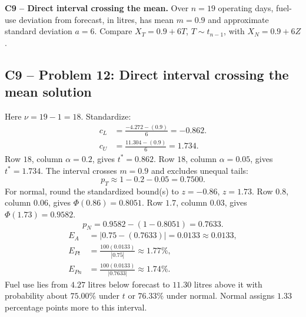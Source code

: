 {
\textbf{C9 -- Direct interval crossing the mean.} Over $n=19$ operating days, fuel-use deviation from forecast, in litres, has mean $m=0.9$ and approximate standard deviation $a=6$. Compare $X_T=0.9+6T$, $T\sim t_{n-1}$, with $X_N=0.9+6Z$.
\label{sol:q12}
\subsection*{C9 -- Problem 12: Direct interval crossing the mean solution }
Here $\nu=19-1=18$. Standardize:
\[
\begin{aligned}
c_L&=\frac{-4.272-(0.9)}{6}=-0.862.\\
c_U&=\frac{11.304-(0.9)}{6}=1.734.
\end{aligned}
\]
Row $18$, column $\alpha=0.2$, gives $t^*=0.862$. Row $18$, column $\alpha=0.05$, gives $t^*=1.734$. 
The interval crosses $m=0.9$ and excludes unequal tails:
\[
p_T\approx1-0.2-0.05=\boxed{0.7500}.
\]
For normal, round the standardized bound(s) to $z=-0.86$, $z=1.73$.
Row $0.8$, column $0.06$, gives $\Phi(0.86)=0.8051$. Row $1.7$, column $0.03$, gives $\Phi(1.73)=0.9582$. 
\[
p_N=0.9582-(1-0.8051)=\boxed{0.7633}.
\]
\[
\begin{aligned}
E_{A}&=|0.75-(0.7633)|=0.0133\approx\boxed{0.0133},\\
E_{Pt}&=\frac{100(0.0133)}{|0.75|}\approx\boxed{1.77\%},\\
E_{Pn}&=\frac{100(0.0133)}{|0.7633|}\approx\boxed{1.74\%}.
\end{aligned}
\]
Fuel use lies from $4.27$ litres below forecast to $11.30$ litres above it with probability about $75.00\%$ under $t$ or $76.33\%$ under normal. Normal assigns $1.33$ percentage points more to this interval.
\secInicio[][sec:q12]
}

